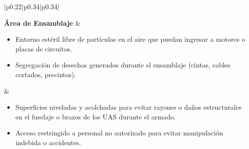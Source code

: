 \begin{longtable}{|p{0.22\textwidth}|p{0.34\textwidth}|p{0.34\textwidth}|}
\vspace{2pt} \raggedright \textbf{Área de Ensamblaje} & 
\begin{minipage}[t]{\linewidth}
\vspace{2pt}
\raggedright
\begin{itemize}[leftmargin=12pt, topsep=0pt, partopsep=0pt, parsep=0pt, itemsep=4pt]
    \item Entorno estéril libre de partículas en el aire que puedan ingresar a motores o placas de circuitos.
    \item Segregación de desechos generados durante el ensamblaje (cintas, cables cortados, precintos).
\end{itemize}
\vspace{2pt}
\end{minipage} & 
\begin{minipage}[t]{\linewidth}
\vspace{2pt}
\raggedright
\begin{itemize}[leftmargin=12pt, topsep=0pt, partopsep=0pt, parsep=0pt, itemsep=4pt]
    \item Superficies niveladas y acolchadas para evitar rayones o daños estructurales en el fuselaje o brazos de los UAS durante el armado.
    \item Acceso restringido a personal no autorizado para evitar manipulación indebida o accidentes.
\end{itemize}
\vspace{2pt}
\end{minipage} \\ \hline


\end{longtable}

